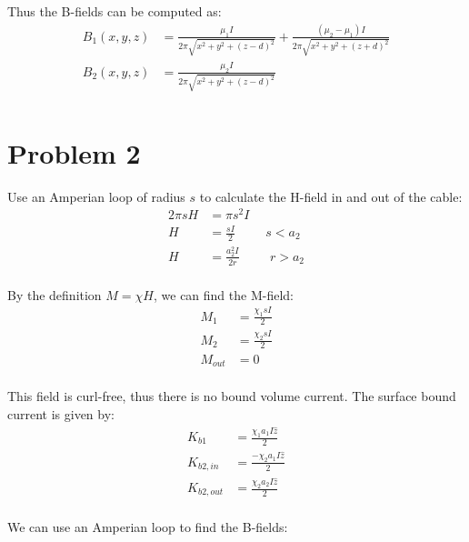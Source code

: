 \documentclass[10pt]{article} %
\begin{document}
Thus the B-fields can be computed as:\\

\begin{align*}
  B_1(x,y,z) &= \frac{\mu_1I}{2\pi\sqrt{x^2+y^2+(z-d)^2}} + \frac{(\mu_2-\mu_1)I}{2\pi\sqrt{x^2+y^2+(z+d)^2}}\\
  B_2(x,y,z) &= \frac{\mu_2I}{2\pi\sqrt{x^2+y^2+(z-d)^2}}\\
\end{align*}


\section{Problem 2}
Use an Amperian loop of radius $s$ to calculate the H-field in and out of the cable:\\

\begin{align*}
  2\pi sH &= \pi s^2 I\\
  H &= \frac{sI}{2} \hspace{1cm} s<a_2\\
  H &= \frac{a_2^2I}{2r} \hspace{1cm} r>a_2\\
\end{align*}

By the definition $M=\chi H$, we can find the M-field:\\

\begin{align*}
  M_1 &= \frac{\chi_1 sI}{2}\\
  M_2 &= \frac{\chi_2 sI}{2}\\
  M_{out} &= 0\\
\end{align*}

This field is curl-free, thus there is no bound volume current. The surface bound current is given by:\\

\begin{align*}
  K_{b1} &= \frac{\chi_1 a_1 I\hat{z}}{2}\\
  K_{b2,in} &= \frac{-\chi_2 a_1 I\hat{z}}{2}\\
  K_{b2,out} &= \frac{\chi_2 a_2 I\hat{z}}{2}\\
\end{align*}

We can use an Amperian loop to find the B-fields:
\end{document}
